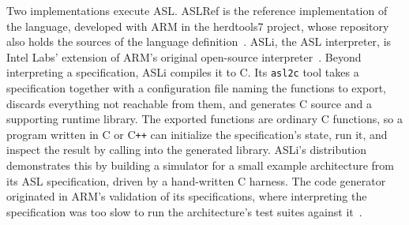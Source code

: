 Two implementations execute ASL. ASLRef is the reference implementation of
the language, developed with ARM in the herdtools7 project, whose repository
also holds the sources of the language definition~\cite{aslref}. ASLi, the
ASL interpreter, is Intel Labs' extension of ARM's original open-source
interpreter~\cite{asli}. Beyond interpreting a specification, ASLi compiles
it to C. Its \texttt{asl2c} tool takes a specification together with a
configuration file naming the functions to export, discards everything not
reachable from them, and generates C source and a supporting runtime
library. The exported functions are ordinary C functions, so a program
written in C or C\texttt{++} can initialize the specification's state, run
it, and inspect the result by calling into the generated library. ASLi's
distribution demonstrates this by building a simulator for a small example
architecture from its ASL specification, driven by a hand-written C harness.
The code generator originated in ARM's validation of its specifications,
where interpreting the specification was too slow to run the
architecture's test suites against it~\cite{reid-trustworthy-specs}.